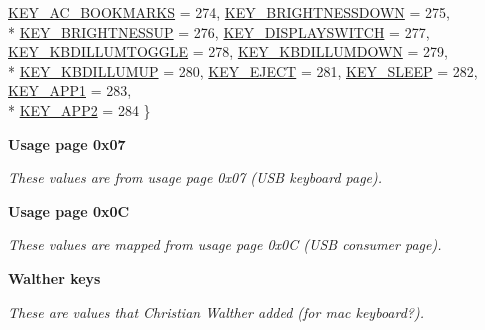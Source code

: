 \begin{DoxyCompactItemize}
\hyperlink{class_input_a4f2253b072b4ee76f282f670de5743eba43832993d6729f2bd1d66cc5927a3bdd}{K\+E\+Y\+\_\+\+A\+C\+\_\+\+B\+O\+O\+K\+M\+A\+R\+K\+S} = 274, 
\hyperlink{class_input_a4f2253b072b4ee76f282f670de5743ebaa3a3cbd776293b284183b7221bdec7bc}{K\+E\+Y\+\_\+\+B\+R\+I\+G\+H\+T\+N\+E\+S\+S\+D\+O\+W\+N} = 275, 
\\*
\hyperlink{class_input_a4f2253b072b4ee76f282f670de5743eba3c80b50377ae35851aecc4b06a8f2361}{K\+E\+Y\+\_\+\+B\+R\+I\+G\+H\+T\+N\+E\+S\+S\+U\+P} = 276, 
\hyperlink{class_input_a4f2253b072b4ee76f282f670de5743eba65587d4ed299790bd028231594590bfb}{K\+E\+Y\+\_\+\+D\+I\+S\+P\+L\+A\+Y\+S\+W\+I\+T\+C\+H} = 277, 
\hyperlink{class_input_a4f2253b072b4ee76f282f670de5743ebab6ce4ce1b0615718598e0cfb46aa8be9}{K\+E\+Y\+\_\+\+K\+B\+D\+I\+L\+L\+U\+M\+T\+O\+G\+G\+L\+E} = 278, 
\hyperlink{class_input_a4f2253b072b4ee76f282f670de5743eba3d689db206a5a8c1c537e12cabec8c85}{K\+E\+Y\+\_\+\+K\+B\+D\+I\+L\+L\+U\+M\+D\+O\+W\+N} = 279, 
\\*
\hyperlink{class_input_a4f2253b072b4ee76f282f670de5743ebadac9cf09072d4d068f994277639701e4}{K\+E\+Y\+\_\+\+K\+B\+D\+I\+L\+L\+U\+M\+U\+P} = 280, 
\hyperlink{class_input_a4f2253b072b4ee76f282f670de5743eba5f7edb588efce768373bcb680952b242}{K\+E\+Y\+\_\+\+E\+J\+E\+C\+T} = 281, 
\hyperlink{class_input_a4f2253b072b4ee76f282f670de5743eba631def9e96ac23109dd63dcb4ced9a85}{K\+E\+Y\+\_\+\+S\+L\+E\+E\+P} = 282, 
\hyperlink{class_input_a4f2253b072b4ee76f282f670de5743eba1e23f27b55a1f9743d5b41b8185cc4a7}{K\+E\+Y\+\_\+\+A\+P\+P1} = 283, 
\\*
\hyperlink{class_input_a4f2253b072b4ee76f282f670de5743ebaf00b61d7f7e4de675e80242d2fa1d02d}{K\+E\+Y\+\_\+\+A\+P\+P2} = 284
 \}
\end{DoxyCompactItemize}
\begin{Indent}{\bf Usage page 0x07}\par
{\em These values are from usage page 0x07 (U\+S\+B keyboard page). }\end{Indent}
\begin{Indent}{\bf Usage page 0x0\+C}\par
{\em These values are mapped from usage page 0x0\+C (U\+S\+B consumer page). }\end{Indent}
\begin{Indent}{\bf Walther keys}\par
{\em These are values that Christian Walther added (for mac keyboard?). }\end{Indent}
